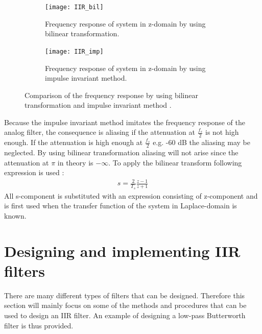 \begin{figure}[H]
\centering
\begin{subfigure}[t]{0.435\textwidth}
\texttt{[image: IIR\_bil]}
	\caption{Frequency response of system in z-domain by using bilinear transformation.}
	\label{fig:IIR_bil}
\end{subfigure}
\hspace{6mm} 
\begin{subfigure}[t]{0.47\textwidth}
\texttt{[image: IIR\_imp]}
	\caption{Frequency response of system in z-domain by using impulse invariant method.}
	\label{fig:IIR_imp}
\end{subfigure}
\caption{Comparison of the frequency response by using bilinear transformation and impulse invariant method \citep{Oppenheim}.}
\label{fig:IIR_transforms}
\end{figure}

Because the impulse invariant method imitates the frequency response of the analog filter, the consequence is aliasing if the attenuation at $\frac{f_s}{2}$ is not high enough. If the attenuation is high enough at $\frac{f_s}{2}$ e.g. -60 dB the aliasing may be neglected. By using bilinear transformation aliasing will not arise since the attenuation at $\pi$ in theory is $-\infty$. To apply the bilinear transform following expression is used \citep{Oppenheim}:
\begin{align}
s = \frac{2}{T_s}\frac{z-1}{z+1}
\label{eq:bilinear_trans2}
\end{align}
All s-component is substituted with an expression consisting of z-component and is first used when the transfer function of the system in Laplace-domain is known. 

\section{Designing and implementing IIR filters}
There are many different types of filters that can be designed. Therefore this section will mainly focus on some of the methods and procedures that can be used to design an IIR filter. An example of designing a low-pass Butterworth filter is thus provided.


